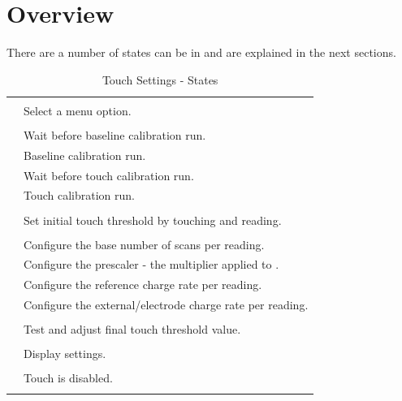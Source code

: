 \section{Overview}

There are a number of states  can be in and are explained in the next
sections.

\begin{longtabu} { X[1,c,m] | X[3,l,m] }
  \thrule
   &  \\ \mrule

   & Select a menu option. \\ \mrule
   \\ \mrule
   & Wait before baseline calibration run. \\ 
   & Baseline calibration run. \\ 
   & Wait before touch calibration run. \\ 
   & Touch calibration run. \\ \mrule
   \\ \mrule
   & Set initial touch threshold by touching and reading. \\ \mrule
   \\ \mrule
   & Configure the base number of scans per reading. \\ 
   & Configure the prescaler - the multiplier applied to . \\ 

  \pagebreak {}

   & Configure the reference charge rate per reading. \\ 
   & Configure the external\slash electrode charge rate per reading. \\ \mrule
   \\ \mrule
   & Test and adjust final touch threshold value. \\ \mrule
   \\ \mrule
   & Display settings. \\ \mrule
   \\ \mrule
   & Touch is disabled. \\
  \bhrule
\caption{Touch Settings - States}
\end{longtabu}

